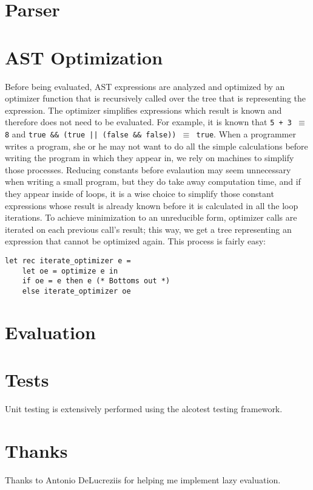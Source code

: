 \documentclass[12pt]{article}
\begin{document}
\section{Parser}

\section{AST Optimization}
Before being evaluated, AST expressions are analyzed and optimized by an
optimizer function that is recursively called over the tree that is representing
the expression. The optimizer simplifies expressions which result is known and
therefore does not need to be evaluated. For example, it is known that \texttt{5
+ 3 $\equiv$ 8} and \texttt{true \&\& (true || (false \&\& false)) $\equiv$
true}. When a programmer writes a program, she or he may not want to do all the
simple calculations before writing the program in which they appear in, we rely
on machines to simplify those processes. Reducing constants before evalaution
may seem unnecessary when writing a small program, but they do take away
computation time, and if they appear inside of loops, it is a wise choice to
simplify those constant expressions whose result is already known before it is
calculated in all the loop iterations. To achieve minimization to an unreducible form, optimizer calls are iterated on
each previous call's result; this way, we get a tree representing an expression
that cannot be optimized again. This process is fairly easy:

\begin{lstlisting}[style=caml]
let rec iterate_optimizer e =
	let oe = optimize e in
	if oe = e then e (* Bottoms out *)
	else iterate_optimizer oe
\end{lstlisting}

\section{Evaluation}

\section{Tests}
Unit testing is extensively performed using the alcotest testing framework.

\section{Thanks}
Thanks to Antonio DeLucreziis for helping me implement lazy evaluation.
\end{document}
